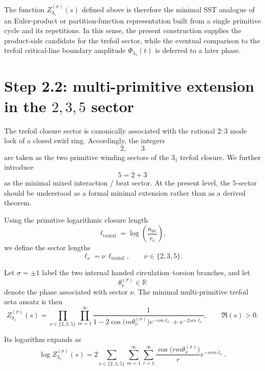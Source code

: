 \documentclass[11pt]{article}
\begin{document}
The function \(Z_{3_1}^{(\sigma)}(s)\) defined above is therefore the minimal SST analogue of an Euler-product or partition-function representation built from a single primitive cycle and its repetitions. In this sense, the present construction supplies the product-side candidate for the trefoil sector, while the eventual comparison to the trefoil critical-line boundary amplitude \(\Phi_{3_1}(t)\) is deferred to a later phase.

\section{Step 2.2: multi-primitive extension in the \(2,3,5\) sector}
    
    The trefoil closure sector is canonically associated with the rational \(2{:}3\) mode lock of a closed swirl ring. Accordingly, the integers
    \[
        2,\qquad 3
    \]
    are taken as the two primitive winding sectors of the \(3_1\) trefoil closure. We further introduce
    \[
        5=2+3
    \]
    as the minimal mixed interaction / beat sector. At the present level, the \(5\)-sector should be understood as a formal minimal extension rather than as a derived theorem.
    
    Using the primitive logarithmic closure length
    \[
        \ell_{\mathrm{trefoil}}
        =
        \log\!\left(\frac{a_{\mathrm{nc}}}{r_c}\right),
    \]
    we define the sector lengths
    \[
        \ell_\nu = \nu\,\ell_{\mathrm{trefoil}},
        \qquad
        \nu\in\{2,3,5\}.
    \]
    
    Let \(\sigma=\pm1\) label the two internal handed circulation--torsion branches, and let
    \[
        \theta_\nu^{(\sigma)}\in\mathbb{R}
    \]
    denote the phase associated with sector \(\nu\). The minimal multi-primitive trefoil zeta ansatz is then
    \begin{equation}
        Z_{3_1}^{(\sigma)}(s)
        =
        \prod_{\nu\in\{2,3,5\}}
        \prod_{m=1}^{\infty}
        \frac{1}{
            1
            -2\cos\!\big(m\theta_\nu^{(\sigma)}\big)e^{-s m \ell_\nu}
            +
            e^{-2s m \ell_\nu}
        },
        \qquad
        \Re(s)>0.
    \end{equation}
    
    Its logarithm expands as
    \begin{equation}
        \log Z_{3_1}^{(\sigma)}(s)
        =
        2\sum_{\nu\in\{2,3,5\}}
        \sum_{m=1}^{\infty}\sum_{r=1}^{\infty}
        \frac{\cos\!\big(rm\theta_\nu^{(\sigma)}\big)}{r}
        e^{-srm\ell_\nu}.
    \end{equation}
    
\end{document}
